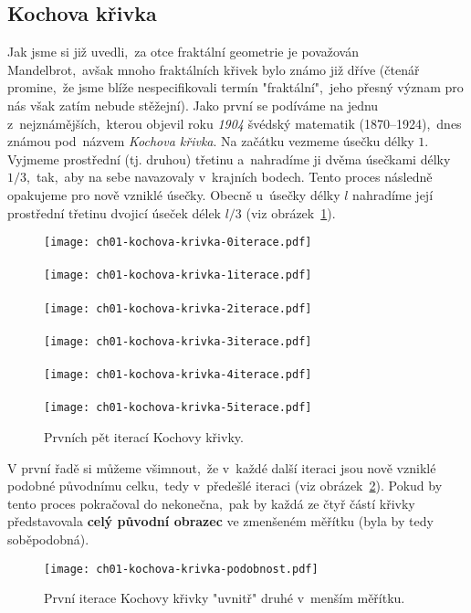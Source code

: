 \subsection{Kochova křivka}\label{subsec:kochova_krivka}
Jak jsme si již uvedli,~za otce fraktální geometrie je považován Mandelbrot,~avšak mnoho fraktálních křivek bylo známo již dříve (čtenář promine,~že jsme blíže nespecifikovali termín "fraktální",~jeho přesný význam pro nás však zatím nebude stěžejní). Jako první se podíváme na jednu z~nejznámějších,~kterou objevil roku \emph{1904} švédský matematik  \mbox{(1870--1924)},~dnes známou pod~názvem \emph{Kochova křivka}. \citep[str. 61]{Peitgen2004} Na začátku vezmeme úsečku délky $1$. Vyjmeme prostřední (tj. druhou) třetinu a~nahradíme ji dvěma úsečkami délky $1/3$,~tak,~aby na sebe navazovaly v~krajních bodech. Tento proces následně opakujeme pro nově vzniklé úsečky. Obecně u~úsečky délky $l$ nahradíme její prostřední třetinu dvojicí úseček délek $l/3$ (viz obrázek~\ref{fig:kochova_vlocka_5iteraci}).
\begin{figure}[h]
    \centering
    \texttt{[image: ch01-kochova-krivka-0iterace.pdf]}\\\qquad\\
    \texttt{[image: ch01-kochova-krivka-1iterace.pdf]}\\\qquad\\
    \texttt{[image: ch01-kochova-krivka-2iterace.pdf]}\\\qquad\\
    \texttt{[image: ch01-kochova-krivka-3iterace.pdf]}\\\qquad\\
    \texttt{[image: ch01-kochova-krivka-4iterace.pdf]}\\\qquad\\
    \texttt{[image: ch01-kochova-krivka-5iterace.pdf]}
    \caption{Prvních pět iterací Kochovy křivky.}
    \label{fig:kochova_vlocka_5iteraci}
\end{figure}
V první řadě si můžeme všimnout,~že v~každé další iteraci jsou nově vzniklé podobné původnímu celku,~tedy v~předešlé iteraci (viz obrázek~\ref{fig:kochova_krivka_podobnost}). Pokud by tento proces pokračoval do nekonečna,~pak by každá ze čtyř částí křivky představovala \textbf{celý původní obrazec} ve zmenšeném měřítku (byla by tedy soběpodobná).
\begin{figure}[h]
    \centering
    \texttt{[image: ch01-kochova-krivka-podobnost.pdf]}
    \caption{První iterace Kochovy křivky "uvnitř" druhé v~menším měřítku.}
    \label{fig:kochova_krivka_podobnost}
\end{figure}
